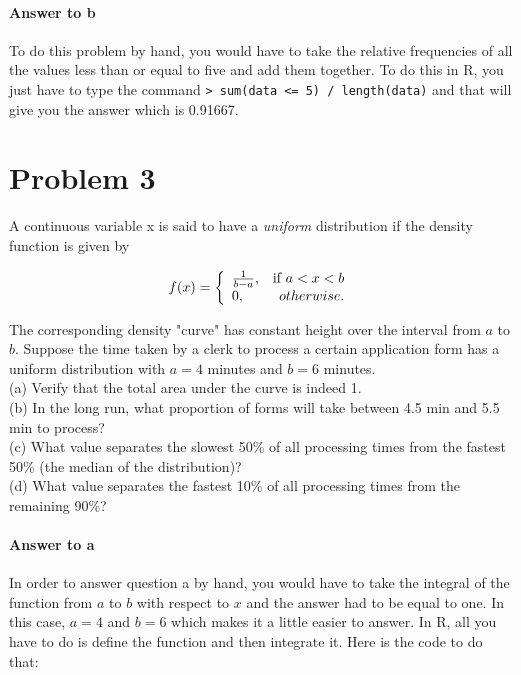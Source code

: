 \documentclass{article}
\begin{document}
	\paragraph{Answer to b}
	To do this problem by hand, you would have to take the relative frequencies of all the values 
	less than or equal to five and add them together. To do this in R, you just have to type the 
	command \texttt{> sum(data <= 5) / length(data)} and that will give you the answer which is 
	0.91667.

\section*{Problem 3}

	A continuous variable x is said to have a \textit{uniform} distribution if the density function is 
	given by
	
	\begin{displaymath}
		f(x) = \left\{
			\begin{array}{lr}
				\frac{1}{b - a}, & $if $ a < x < b \\
				0, & otherwise.
			\end{array}
		\right.
	\end{displaymath}
	
	\noindent The corresponding density "curve" has constant height over the interval from $a$ to 
	$b$. Suppose the time taken by a clerk to process a certain application form has a uniform 
	distribution with $a = 4$ minutes and $b = 6$ minutes. \\
	
	\noindent (a) Verify that the total area under the curve is indeed 1. \\
	(b) In the long run, what proportion of forms will take between 4.5 min and 5.5 min to 
	process? \\
	(c) What value separates the slowest 50\% of all processing times from the fastest 50\% (the
	median of the distribution)? \\
	(d) What value separates the fastest 10\% of all processing times from the remaining 90\%?
	
	\paragraph{Answer to a} In order to answer question a by hand, you would have to take the 
	integral of the function from $a$ to $b$ with respect to $x$ and the answer had to be equal to 
	one. In this case, $a = 4$ and $b = 6$ which makes it a little easier to answer. In R, all you have 
	to do is define the function and then integrate it. Here is the code to do that:
	
\end{document}

